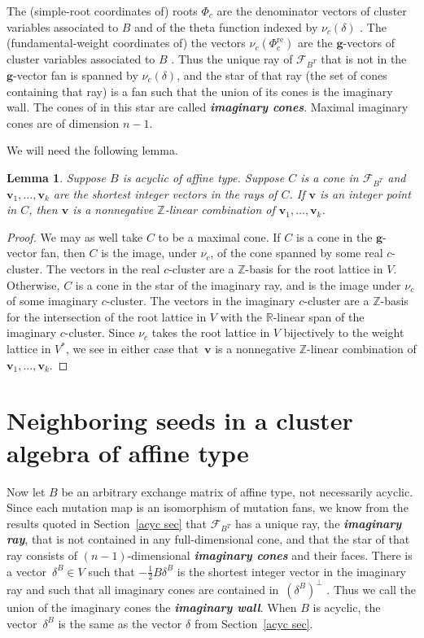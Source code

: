 \documentclass{amsart}
\newtheorem{lemma}[proposition]{Lemma}
\theoremstyle{definition}
\theoremstyle{remark}
\numberwithin{equation}{section}
\newcommand{\newword}[1]{\textbf{\emph{#1}}}
\newcommand{\integers}{\mathbb Z}
\newcommand{\reals}{\mathbb R}
\newcommand{\F}{{\mathcal F}}
\newcommand{\0}{{\mathbf{0}}}
\newcommand{\g}{\mathbf{g}}
\renewcommand{\v}{\mathbf{v}}
\newcommand{\re}{\mathrm{re}}
\newcommand{\RSChar}{\Phi}
\newcommand{\RS}{\RSChar}
\newcommand{\AP}[1]{\RS_{#1}}
\newcommand{\APre}[1]{\AP{#1}^\re}
\begin{document}
The (simple-root coordinates of) roots $\AP{c}$ are the denominator vectors of cluster variables associated to $B$ \cite[Theorem~1.2]{affdenom} and of the theta function indexed by $\nu_c(\delta)$ \cite[Corollary~3.6]{afftheta}.
The (fundamental-weight coordinates of) the vectors $\nu_c(\APre{c})$ are the $\g$-vectors of cluster variables associated to $B$ \cite[Proposition~9]{Rupel}.
Thus the unique ray of $\F_{B^T}$ that is not in the $\g$-vector fan is spanned by $\nu_c(\delta)$, and the star of that ray (the set of cones containing that ray) is a fan such that the union of its cones is the imaginary wall.
The cones of in this star are called \newword{imaginary cones}.
Maximal imaginary cones are of dimension $n-1$.

We will need the following lemma.

\begin{lemma}\label{int span}
Suppose $B$ is acyclic of affine type.
Suppose $C$ is a cone in $\F_{B^T}$ and $\v_1,\ldots,\v_k$ are the shortest integer vectors in the rays of $C$.
If $\v$ is an integer point in $C$, then $\v$ is a nonnegative $\integers$-linear combination of $\v_1,\ldots,\v_k$.
\end{lemma}
\begin{proof}
We may as well take $C$ to be a maximal cone.
If $C$ is a cone in the $\g$-vector fan, then $C$ is the image, under $\nu_c$, of the cone spanned by some real $c$-cluster.
The vectors in the real $c$-cluster are a $\integers$-basis for the root lattice in $V$.
Otherwise, $C$ is a cone in the star of the imaginary ray, and is the image under $\nu_c$ of some imaginary $c$-cluster.
The vectors in the imaginary $c$-cluster are a $\integers$-basis for the intersection of the root lattice in $V$ with the $\reals$-linear span of the imaginary $c$-cluster.
Since $\nu_c$ takes the root lattice in $V$ bijectively to the weight lattice in $V^*$, we see in either case that~$\v$ is a nonnegative $\integers$-linear combination of $\v_1,\ldots,\v_k$.
\end{proof}

\section{Neighboring seeds in a cluster algebra of affine type}\label{neigh sec}
Now let $B$ be an arbitrary exchange matrix of affine type, not necessarily acyclic.
Since each mutation map is an isomorphism of mutation fans, we know from the results quoted in Section~\ref{acyc sec} that $\F_{B^T}$ has a unique ray, the \newword{imaginary ray}, that is not contained in any full-dimensional cone, and that the star of that ray consists of $(n-1)$-dimensional \newword{imaginary cones} and their faces.
There is a vector~${\delta^B\in V}$ such that $-\frac12B\delta^B$ is the shortest integer vector in the imaginary ray and such that all imaginary cones are contained in~$(\delta^B)^\perp$ \cite[Proposition~4.24]{affdomreg}.
Thus we call the union of the imaginary cones the \newword{imaginary wall}.
When $B$ is acyclic, the vector~$\delta^B$ is the same as the vector $\delta$ from Section~\ref{acyc sec}.
\end{document}
